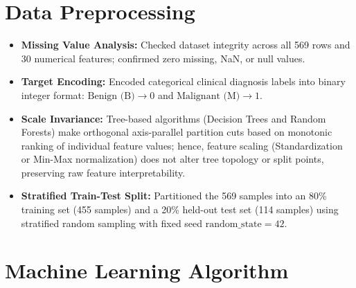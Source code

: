 \documentclass[12pt,a4paper]{article}
\begin{document}
\section{Data Preprocessing}
\begin{itemize}
\item \textbf{Missing Value Analysis:} Checked dataset integrity across all 569 rows and 30 numerical features; confirmed zero missing, NaN, or null values.
\item \textbf{Target Encoding:} Encoded categorical clinical diagnosis labels into binary integer format: $\text{Benign (B)} \rightarrow 0$ and $\text{Malignant (M)} \rightarrow 1$.
\item \textbf{Scale Invariance:} Tree-based algorithms (Decision Trees and Random Forests) make orthogonal axis-parallel partition cuts based on monotonic ranking of individual feature values; hence, feature scaling (Standardization or Min-Max normalization) does not alter tree topology or split points, preserving raw feature interpretability.
\item \textbf{Stratified Train-Test Split:} Partitioned the 569 samples into an 80\% training set (455 samples) and a 20\% held-out test set (114 samples) using stratified random sampling with fixed seed $\text{random\_state}=42$.
\end{itemize}

\section{Machine Learning Algorithm}
\end{document}
